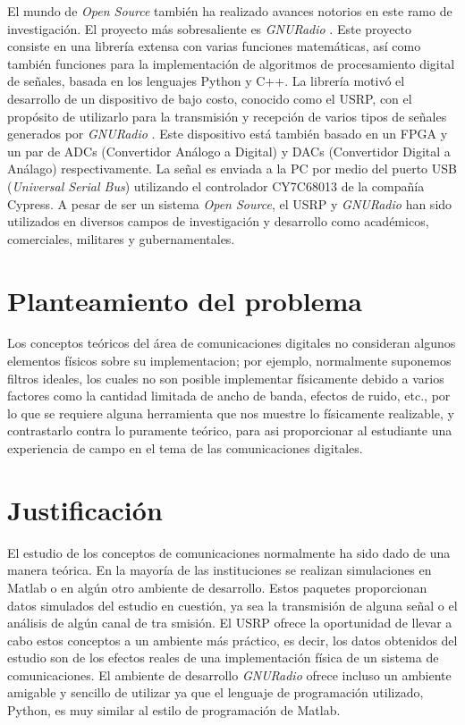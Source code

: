 El mundo de \emph{Open Source} tambi\'en ha realizado avances notorios en este ramo de investigaci\'on. El proyecto m\'as
sobresaliente es \emph{GNURadio} \cite{radio}. Este proyecto consiste en una librer\'ia extensa con varias funciones
matem\'aticas, as\'i como tambi\'en funciones para la implementaci\'on de algoritmos de procesamiento digital de se\~nales,
basada en los lenguajes Python y C++. La librer\'ia motiv\'o el desarrollo de un dispositivo de bajo costo, conocido
como el USRP, con el prop\'osito de utilizarlo para la transmisi\'on y recepci\'on de varios tipos de se\~nales generados
por \emph{GNURadio} \cite{ettus}. Este dispositivo est\'a tambi\'en basado en un FPGA y un par de ADCs (Convertidor
An\'alogo a Digital) y DACs (Convertidor Digital a An\'alago) respectivamente. La se\~nal es enviada a la PC por medio del puerto USB
(\emph{Universal Serial Bus}) utilizando el controlador CY7C68013 de la compa\~n\'ia Cypress. A pesar de ser un sistema
\emph{Open Source}, el USRP y \emph{GNURadio} han sido utilizados en diversos campos de investigaci\'on y desarrollo como
acad\'emicos, comerciales, militares y gubernamentales.

\section{Planteamiento del problema}
Los conceptos te\'oricos del \'area de comunicaciones digitales no consideran algunos elementos f\'isicos sobre su
implementacion; por ejemplo, normalmente suponemos filtros ideales, los cuales no son posible implementar f\'isicamente
debido a varios factores como la cantidad limitada de ancho de banda, efectos de ruido, etc., por lo que se requiere alguna
herramienta que nos muestre lo f\'isicamente realizable, y contrastarlo contra lo puramente te\'orico, para asi proporcionar
al estudiante una experiencia de campo en el tema de las comunicaciones digitales.

\section{Justificaci\'on}

El estudio de los conceptos de comunicaciones normalmente ha sido dado de una manera te\'orica. En la mayor\'ia de las
instituciones se realizan simulaciones en Matlab o en alg\'un otro ambiente de desarrollo. Estos paquetes proporcionan datos
simulados del estudio en cuesti\'on, ya sea la transmisi\'on de alguna se\~nal o el an\'alisis de alg\'un canal de tra
smisi\'on. El USRP ofrece la oportunidad de llevar a cabo estos conceptos a un ambiente m\'as pr\'actico, es decir, los
datos obtenidos del estudio son de los efectos reales de una implementaci\'on f\'isica de un sistema de comunicaciones. El
ambiente de desarrollo \emph{GNURadio} ofrece incluso un ambiente amigable y sencillo de utilizar ya que el lenguaje de
programaci\'on utilizado, Python, es muy similar al estilo de programaci\'on de Matlab.

